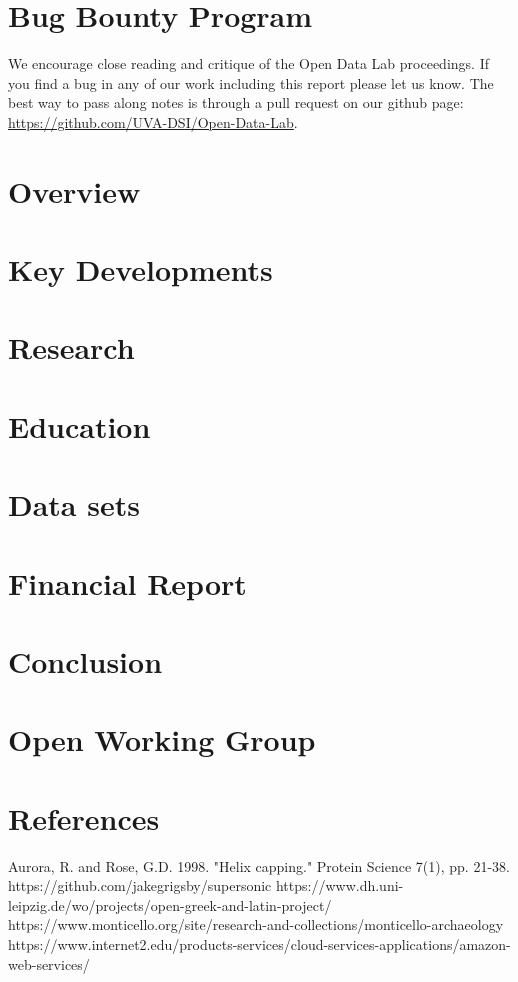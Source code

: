 \documentclass[12pt,letterpaper]{book} %
\begin{document}
\chapter*{Bug Bounty Program}
We encourage close reading and critique of the Open Data Lab proceedings. If you find a bug in any of our work including this report please let us know. The best way to pass along notes is through a pull request on our github page: \url{https://github.com/UVA-DSI/Open-Data-Lab}.

\tableofcontents
\listoffigures
\listoftables

\mainmatter
\chapter{Overview} 
\chapter{Key Developments} 
\chapter{Research} 
\chapter{Education} 
\chapter{Data sets} 	
\chapter{Financial Report} 
\chapter{Conclusion}

\appendix
\chapter{Open Working Group}\label{chap:owg}
 

\chapter{References}
\begin{thebibliography}{99}
 Aurora, R. and Rose, G.D. 1998. "Helix capping." Protein Science 7(1), pp. 21-38.
 https://github.com/jakegrigsby/supersonic
 https://www.dh.uni-leipzig.de/wo/projects/open-greek-and-latin-project/
 https://www.monticello.org/site/research-and-collections/monticello-archaeology
 https://www.internet2.edu/products-services/cloud-services-applications/amazon-web-services/
\end{thebibliography}
\end{document}
